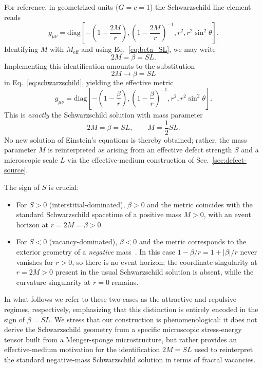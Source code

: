 \documentclass[%
  reprint,
  superscriptaddress,
  showpacs,
  showkeys,
  amsmath,amssymb,
  pra,
  longbibliography,
  floatfix,
  x11names
]{revtex4-2}
\begin{document}
For reference, in geometrized units ($G=c=1$) the Schwarzschild line element reads
\begin{equation}
g_{\mu\nu} = \text{diag}\left[-\left(1 - \frac{2M}{r}\right), \left(1 - \frac{2M}{r}\right)^{-1}, r^2, r^2 \sin^2 \theta\right].
\label{eq:schwarzschild}
\end{equation}
Identifying $M$ with $M_{\text{eff}}$ and using Eq.~\eqref{eq:beta_SL}, we may write
\begin{equation}
2M = \beta = SL.
\end{equation}
Implementing this identification amounts to the substitution
\begin{equation}
2M \longrightarrow \beta = SL
\end{equation}
in Eq.~\eqref{eq:schwarzschild}, yielding the effective metric
\begin{equation}
g_{\mu\nu} = \text{diag}\left[-\left(1 - \frac{\beta}{r}\right), \left(1 - \frac{\beta}{r}\right)^{-1}, r^2, r^2 \sin^2 \theta\right].
\label{eq:defect_metric}
\end{equation}
This is \emph{exactly} the Schwarzschild solution with mass parameter
\begin{equation}
2M = \beta = SL, \qquad M = \frac{1}{2} SL.
\end{equation}
No new solution of Einstein's equations is thereby obtained; rather, the mass parameter $M$ is reinterpreted as arising from an effective defect strength $S$ and a microscopic scale $L$ via the effective-medium construction of Sec.~\ref{sec:defect-source}.

The sign of $S$ is crucial:

\begin{itemize}
\item For $S > 0$ (interstitial-dominated), $\beta>0$ and the metric coincides with the standard Schwarzschild spacetime of a positive mass $M>0$, with an event horizon at $r=2M=\beta>0$.
\item For $S < 0$ (vacancy-dominated), $\beta<0$ and the metric corresponds to the exterior geometry of a \emph{negative} mass~\cite{bondi-1957}. In this case $1-\beta/r = 1+|\beta|/r$ never vanishes for $r>0$, so there is no event horizon; the coordinate singularity at $r=2M>0$ present in the usual Schwarzschild solution is absent, while the curvature singularity at $r=0$ remains.
\end{itemize}

In what follows we refer to these two cases as the attractive and repulsive regimes, respectively, emphasizing that this distinction is entirely encoded in the sign of $\beta = SL$. We stress that our construction is phenomenological: it does not derive the Schwarzschild geometry from a specific microscopic stress-energy tensor built from a Menger-sponge microstructure, but rather provides an effective-medium motivation for the identification $2M=SL$ used to reinterpret the standard negative-mass Schwarzschild solution in terms of fractal vacancies.
\end{document}
